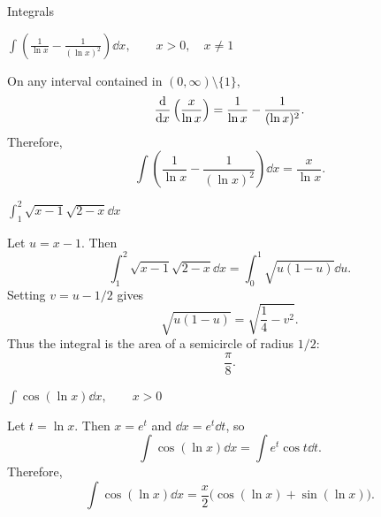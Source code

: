 \begin{expectedproblemgroup}{Integrals}
        \begin{expectedsubproblem}
            \(\displaystyle
                \int\left(\frac{1}{\ln x}-\frac{1}{(\ln x)^2}\right)\dd x,
                \qquad x>0,\quad x\neq1
            \)
        \end{expectedsubproblem}

        \begin{expectedsubsolution}
            On any interval contained in $(0,\infty)\setminus\{1\}$,
            \[
                \frac{\mathop{}\!\mathrm{d} }{\mathop{}\!\mathrm{d} x}\left(\frac{x}{\ln x}\right)
                =
                \frac{1}{\ln x}
                -
                \frac{1}{(\ln x)^2}.
            \]
            Therefore,
            \[
                \boxed{
                    \int
                    \left(
                        \frac{1}{\ln x}
                        -
                        \frac{1}{(\ln x)^2}
                    \right)\dd x
                    =
                    \frac{x}{\ln x}
                }.
            \]
        \end{expectedsubsolution}

        \begin{expectedsubproblem}
            \(\displaystyle
                \int_1^2\sqrt{x-1}\sqrt{2-x}\dd x
            \)
        \end{expectedsubproblem}

        \begin{expectedsubsolution}
            Let $u=x-1$. Then
            \[
                \int_1^2\sqrt{x-1}\sqrt{2-x}\dd x
                =
                \int_0^1\sqrt{u(1-u)}\dd u.
            \]
            Setting $v=u-1/2$ gives
            \[
                \sqrt{u(1-u)}
                =
                \sqrt{\frac{1}{4}-v^2}.
            \]
            Thus the integral is the area of a semicircle of radius $1/2$:
            \[
                \boxed{\frac{\pi}{8}}.
            \]
        \end{expectedsubsolution}

        \begin{expectedsubproblem}
            \(\displaystyle
                \int\cos(\ln x)\dd x,
                \qquad x>0
            \)
        \end{expectedsubproblem}

        \begin{expectedsubsolution}
            Let $t=\ln x$. Then $x=e^t$ and $\dd x=e^t\dd t$, so
            \[
                \int\cos(\ln x)\dd x
                =
                \int e^t\cos t\dd t.
            \]
            Therefore,
            \[
                \boxed{
                    \int\cos(\ln x)\dd x
                    =
                    \frac{x}{2}
                    \bigl(\cos(\ln x)+\sin(\ln x)\bigr)
                }.
            \]
        \end{expectedsubsolution}


\end{expectedproblemgroup}
